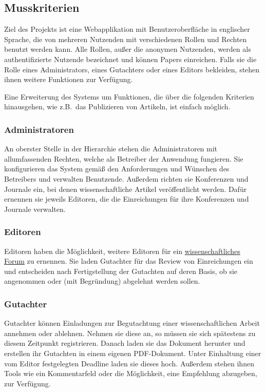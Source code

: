 
\subsection{Musskriterien}
Ziel des Projekts ist eine Webapplikation mit Benutzeroberfläche in englischer Sprache, die von mehreren Nutzenden mit verschiedenen Rollen und Rechten benutzt werden kann.
Alle Rollen, außer die anonymen Nutzenden, werden als authentifizierte Nutzende bezeichnet und können Papers einreichen.
Falls sie die Rolle eines Administrators, eines Gutachters oder eines Editors bekleiden, stehen ihnen weitere Funktionen zur Verfügung.

Eine Erweiterung des Systems um Funktionen, die über die folgenden Kriterien hinausgehen, wie z.B.\ das Publizieren von Artikeln, ist einfach möglich.

\subsubsection{Administratoren}\label{mkrit:admin}
An oberster Stelle in der Hierarchie stehen die Administratoren mit allumfassenden Rechten, welche als Betreiber der Anwendung fungieren.
Sie konfigurieren das System gemäß den Anforderungen und Wünschen des Betreibers und verwalten Benutzende.
Außerdem richten sie Konferenzen und Journale ein, bei denen wissenschaftliche Artikel veröffentlicht werden.
Dafür ernennen sie jeweils Editoren, die die Einreichungen für ihre Konferenzen und Journale verwalten.

\subsubsection{Editoren}\label{mkrit:editor}
Editoren haben die Möglichkeit, weitere Editoren für ein \hyperref[glo:wissForum]{wissenschaftliches Forum} zu ernennen.
Sie laden Gutachter für das Review von Einreichungen ein und entscheiden nach Fertigstellung der Gutachten auf deren Basis, ob sie angenommen oder (mit Begründung) abgelehnt werden sollen.

\subsubsection{Gutachter}\label{mkrit:gutachter}
Gutachter können Einladungen zur Begutachtung einer wissenschaftlichen Arbeit annehmen oder ablehnen.
Nehmen sie diese an, so müssen sie sich spätestens zu diesem Zeitpunkt registrieren.
Danach laden sie das Dokument herunter und erstellen ihr Gutachten in einem eigenen PDF-Dokument.
Unter Einhaltung einer vom Editor festgelegten Deadline laden sie dieses hoch.
Außerdem stehen ihnen Tools wie ein Kommentarfeld oder die Möglichkeit, eine Empfehlung abzugeben, zur Verfügung.

